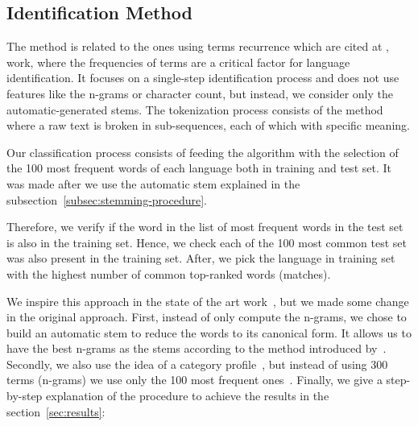 \documentclass[runningheads]{llncs}
\begin{document}
    \subsection{Identification Method}\label{subsec:identification-method}

    The method is related to the ones using terms recurrence which are cited at \cite{jauhiainen2019automatic},~\cite{cavnar1994n} work, where the frequencies of terms are a critical factor for language identification.  It focuses on a single-step identification process and does not use features like the n-grams or character count, but instead, we consider only the automatic-generated stems.
    The tokenization process consists of the method where a raw text is broken in sub-sequences, each of which with specific meaning\cite{webster1992tokenization}.

    Our classification process consists of feeding the algorithm with the selection of the 100 most frequent words of each language both in training and test set. It was made after we use the automatic stem explained in the
    subsection~\ref{subsec:stemming-procedure}.

    Therefore, we verify if the word in the list of most frequent words in the test set is also in the training set.
    Hence, we check each of the 100 most common test set was also present in the training set. After, we pick the language in training set with the highest number of common top-ranked words (matches).

    We inspire this approach in the state of the art work~\cite{cavnar1994n}, but we made some change in the original approach. First, instead of only compute the n-grams, we chose to build an automatic stem to reduce the words to its canonical form. It allows us to have the best n-grams as the stems according to the method introduced by~\cite{goldsmith2000automatic}. Secondly, we also use the idea of a category profile~\cite{cavnar1994n}, but instead of using 300 terms (n-grams) we use only the 100 most frequent ones~\cite{cavnar1994n}. Finally, we give a step-by-step explanation of the procedure to achieve the results in the section~\ref{sec:results}:
\end{document}
